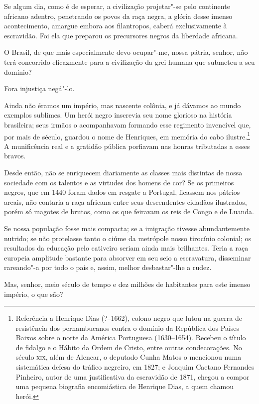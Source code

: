 Se algum dia, como é de esperar, a civilização projetar"-se pelo
continente africano adentro, penetrando os povos da raça negra, a
glória desse imenso acontecimento, amargue embora aos filantropos,
caberá exclusivamente à escravidão. Foi ela que preparou os precursores
negros da liberdade africana.

O Brasil, de que mais especialmente devo ocupar"-me, nossa pátria,
senhor, não terá concorrido eficazmente para a civilização da grei
humana que submeteu a seu domínio?

Fora injustiça negá"-lo.

Ainda não éramos um império, mas nascente colônia, e já dávamos ao mundo
exemplos sublimes. Um herói negro inscrevia seu nome glorioso na
história brasileira; seus irmãos o acompanhavam formando esse regimento
invencível que, por mais de século, guardou o nome de Henriques, em
memória do cabo
ilustre.\footnote{ Referência a Henrique Dias (?--1662), colono negro que lutou na 
guerra de resistência dos pernambucanos contra o domínio da República dos Países Baixos 
sobre o norte da América Portuguesa (1630--1654). Recebeu o título de fidalgo e o Hábito 
da Ordem de Cristo, entre outras condecorações. No século \textsc{xix}, além de Alencar, o deputado 
Cunha Matos o mencionou numa sistemática defesa do tráfico negreiro, em 1827; e Joaquim 
Caetano Fernandes Pinheiro, autor de uma justificativa da escravidão de 1871, chegou a 
compor uma pequena biografia encomiástica de Henrique Dias, a quem chamou herói.}  
A munificência real e a gratidão pública porfiavam nas honras tributadas a esses bravos.

Desde então, não se enriquecem diariamente as classes mais distintas de
nossa sociedade com os talentos e as virtudes dos homens de cor? Se os
primeiros negros, que em 1440 foram dados em resgate a Portugal,
ficassem nos pátrios areais, não contaria a raça africana entre seus
descendentes cidadãos ilustrados, porém só magotes de brutos, como os
que feiravam os reis de Congo e de Luanda. 

Se nossa população fosse mais compacta; se a imigração tivesse
abundantemente nutrido; se não protelasse tanto o ciúme da metrópole
nosso tirocínio colonial; os resultados da educação pelo cativeiro
seriam ainda mais brilhantes. Teria a raça europeia amplitude bastante
para absorver em seu seio a escravatura, disseminar rareando"-a por
todo o país e, assim, melhor desbastar"-lhe a rudez. 

Mas, senhor, meio século de tempo e dez milhões de habitantes para este
imenso império, o que são?

